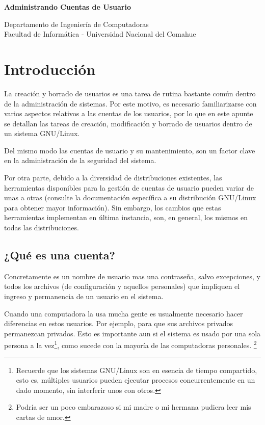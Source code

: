 \documentclass[12pt]{article}
\def\maketitle{

 \makeatletter
 {\color{bl} \centering \huge \sc \textbf{
Administrando Cuentas de Usuario \\
 \vspace*{8pt} }\par}
 \makeatother


 \makeatletter
 {\centering \small 
 	Departamento de Ingeniería de Computadoras \\
 	Facultad de Informática - Universidad Nacional del Comahue \\
 	\vspace{20pt} }
 \makeatother

}
\begin{document}
\thispagestyle{empty}
\maketitle
\setlength{\parindent}{0pt}




\section{Introducción}
La creación y borrado de usuarios es una tarea de rutina bastante 
común dentro de la administración de sistemas. Por este motivo, 
es necesario familiarizarse con varios aspectos relativos a las
cuentas de los usuarios, por lo que en este apunte se detallan 
las tareas de creación, modificación y borrado de usuarios dentro 
de un sistema GNU/Linux.

Del mismo modo las cuentas de usuario y su mantenimiento, son un 
factor clave en la administración de la seguridad del sistema.

Por otra parte, debido a la diversidad de distribuciones existentes,
las herramientas disponibles para la gestión de cuentas de usuario pueden 
variar de unas a otras (consulte la documentación
específica a su distribución GNU/Linux para obtener mayor información). Sin 
embargo, los cambios que estas herramientas implementan  en última instancia, 
son, en general, los mismos en todas las distribuciones.  

\subsection{ ¿Qué es una cuenta?}
Concretamente es un nombre de usuario mas una contraseña, salvo
excepciones, y todos los archivos (de configuración y aquellos personales) que
impliquen el ingreso y permanencia de un usuario en el sistema.

Cuando una computadora la usa mucha gente es usualmente necesario hacer
diferencias en estos usuarios. Por ejemplo, para que sus archivos privados
permanezcan privados. Esto es importante aun si el sistema es usado por una
sola persona a la vez\footnote{Recuerde que los sistemas GNU/Linux son 
en esencia de tiempo compartido, esto es, múltiples usuarios pueden ejecutar
procesos concurrentemente en un dado momento, sin interferir unos con otros.},
como sucede con la mayoría de las computadoras personales.
\footnote{Podría ser un poco embarazoso si mi madre o mi hermana pudiera leer 
mis cartas de amor.} 
\end{document}
